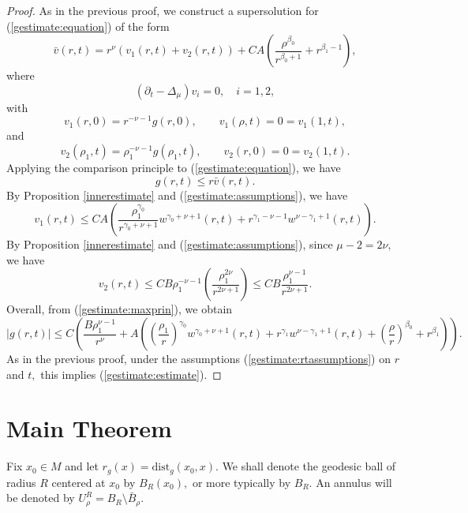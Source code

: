\documentclass[12pt]{amsart}
\newcommand{\dist}{{\mbox{dist}}}
\theoremstyle{others}
\numberwithin{equation}{section}
\newcommand{\p}{\partial}
\begin{document}
\begin{proof} As in the previous proof, we construct a supersolution for (\ref{gestimate:equation}) of the form
$$\bar{v}(r,t) = r^\nu \left( v_1(r,t) + v_2(r,t) \right) + C A \left( \frac{\rho^{\beta_0}}{r^{\beta_0 + 1}} + r^{\beta_1 - 1} \right),$$
where
$$\left( \p_t - \Delta_\mu \right) v_i = 0, \quad i = 1,2,$$
with
$$v_1(r,0) = r^{-\nu - 1} g(r,0), \qquad v_1(\rho,t) = 0 = v_1(1,t),$$
and
$$v_2(\rho_1, t) = \rho_1^{-\nu - 1} g(\rho_1, t), \qquad v_2(r,0) = 0= v_2(1,t).$$
Applying the comparison principle to (\ref{gestimate:equation}), we have
\begin{equation}\label{gestimate:maxprin}
g(r,t) \leq r \bar{v}(r,t).
\end{equation}
By Proposition \ref{innerestimate} and (\ref{gestimate:assumptions}), we have
\begin{equation*}
v_1(r,t) \leq C A \left( \frac{\rho_1^{\gamma_0}}{r^{\gamma_0 + \nu + 1} }w^{\gamma_0 + \nu + 1} \left( r,t \right) + r^{\gamma_1 - \nu - 1} w^{\nu - \gamma_1 + 1}(r,t) \right).
\end{equation*}
By Proposition \ref{innerestimate} and (\ref{gestimate:assumptions}), since $\mu - 2 = 2\nu,$ we have
\begin{equation*}
v_2(r,t) \leq C B \rho_1^{-\nu - 1} \left( \frac{\rho_1^{2 \nu}}{r^{2 \nu + 1}} \right) \leq CB \frac{\rho_1^{\nu - 1}}{r^{2\nu + 1}}.
\end{equation*}
Overall, from (\ref{gestimate:maxprin}), we obtain
\begin{equation*}
| g(r,t) | \leq C\left( \frac{B \rho_1^{\nu - 1}}{r^\nu} + A \left( \left( \frac{\rho_1}{r} \right)^{\gamma_0} w^{\gamma_0 + \nu + 1}(r,t) +  r^{\gamma_1} w^{\nu - \gamma_1 + 1}(r,t) + \left( \frac{\rho}{r} \right)^{\beta_0} + r^{\beta_1} \right) \right).
\end{equation*}
As in the previous proof, under the assumptions (\ref{gestimate:rtassumptions}) on $r$ and $t,$ this implies (\ref{gestimate:estimate}).
\end{proof}




\section{Main Theorem}\label{sec:mainthm}


Fix $x_0 \in M$ and let $r_g(x) = \dist_g(x_0, x).$ We shall denote the geodesic ball of radius $R$ centered at $x_0$ by $B_R(x_0),$ or more typically by $B_R.$ An annulus will be denoted by $U_\rho^R = B_R \setminus \bar{B}_\rho.$
\end{document}
